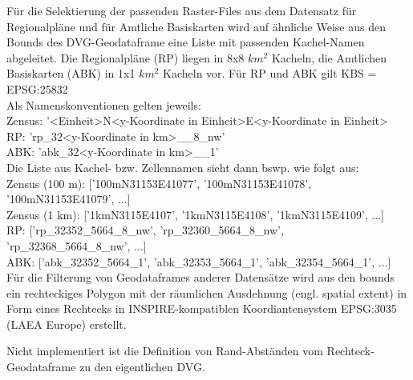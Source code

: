 			Für die Selektierung der passenden Raster-Files aus dem Datensatz für Regionalpläne und für Amtliche Basiskarten wird auf ähnliche Weise aus den Bounds des DVG-Geodataframe eine Liste mit passenden Kachel-Namen abgeleitet. 
			Die Regionalpläne (RP) liegen in 8x8 $km^2$ Kacheln, die Amtlichen Basiskarten (ABK) in 1x1 $km^2$ Kacheln vor. Für RP und ABK gilt KBS = EPSG:25832 \\
			
			Als Namenskonventionen gelten jeweils: \\
			Zensus: '<Einheit>N<y-Koordinate in \flq Einheit\frq>E<y-Koordinate in \flq Einheit\frq >\\
			RP: 'rp\_32<y-Koordinate in km>\_<x-Koordinate in km>\_8\_nw'\\
			ABK: 'abk\_32<y-Koordinate in km>\_<x-Koordinate in km>\_1'\\
			
			Die Liste aus Kachel- bzw. Zellennamen sieht dann bswp. wie folgt aus: \\
			Zensus (100 m): ['100mN31153E41077', '100mN31153E41078', '100mN31153E41079', ...] \\ 
			Zensus (1 km): ['1kmN3115E4107', '1kmN3115E4108', '1kmN3115E4109', ...]\\
			RP: ['rp\_32352\_5664\_8\_nw', 'rp\_32360\_5664\_8\_nw', 'rp\_32368\_5664\_8\_nw', ...]\\
			ABK: ['abk\_32352\_5664\_1', 'abk\_32353\_5664\_1', 'abk\_32354\_5664\_1', ...]\\
			
			Für die Filterung von Geodataframes anderer Datensätze wird aus den bounds ein rechteckiges Polygon mit der räumlichen Ausdehnung (engl. spatial extent) in Form eines Rechtecks in INSPIRE-kompatiblen Koordiantensystem EPSG:3035 (LAEA Europe) erstellt. 
			
			Nicht implementiert ist die Definition von Rand-Abständen vom Rechteck-Geodataframe zu den eigentlichen DVG. 
			


